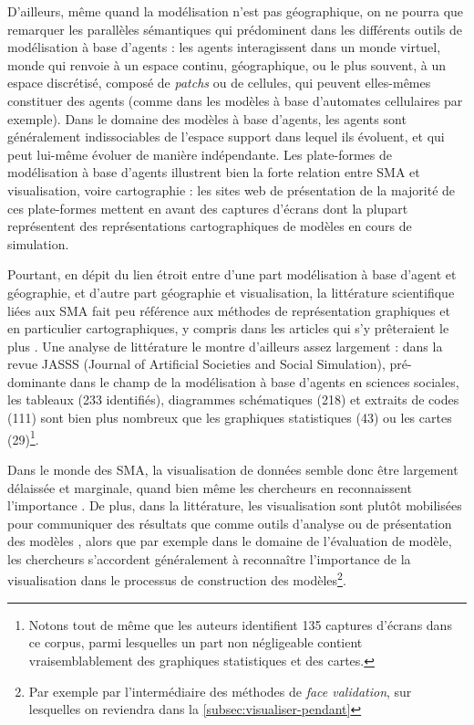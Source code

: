 \documentclass[a4paper, 12pt]{article}
\begin{document}
D'ailleurs, même quand la modélisation n'est pas géographique, on ne pourra que remarquer les parallèles sémantiques qui prédominent dans les différents outils de modélisation à base d'agents : les agents interagissent dans un \og monde virtuel\fg{}, monde qui renvoie à un espace continu, géographique, ou le plus souvent, à un espace discrétisé, composé de \og \textit{patchs} \fg{} ou de cellules, qui peuvent elles-mêmes constituer des agents (comme dans les modèles à base d'automates cellulaires par exemple). Dans le domaine des modèles à base d'agents, les agents sont généralement indissociables de l'espace support dans lequel ils évoluent, et qui peut lui-même évoluer de manière indépendante.
Les plate-formes de modélisation à base d'agents illustrent bien la forte relation entre SMA et visualisation, voire cartographie : les sites web de présentation de la majorité de ces plate-formes mettent en avant des captures d'écrans dont la plupart représentent des représentations cartographiques de modèles en cours de simulation.

Pourtant, en dépit du lien étroit entre d'une part modélisation à base d'agent et géographie, et d'autre part géographie et visualisation, la littérature scientifique liées aux SMA fait peu référence aux méthodes de représentation graphiques et en particulier cartographiques, y compris dans les articles qui s'y prêteraient le plus \autocite{lee_complexities_2015,kornhauser}.
Une analyse de littérature le montre d'ailleurs assez largement \autocite[Table 4]{angus_anarchy_2015} : dans la revue JASSS (Journal of Artificial Societies and Social Simulation), pré-dominante dans le champ de la modélisation à base d'agents en sciences sociales, les tableaux (233 identifiés), diagrammes schématiques (218) et extraits de codes (111) sont bien plus nombreux que les graphiques statistiques (43) ou les cartes (29)\footnote{Notons tout de même que les auteurs identifient 135 captures d'écrans dans ce corpus, parmi lesquelles un part non négligeable contient vraisemblablement des graphiques statistiques et des cartes.}.

Dans le monde des SMA, la visualisation de données semble donc être largement délaissée et marginale, quand bien même les chercheurs en reconnaissent l'importance \autocite{kornhauser}. De plus, dans la littérature, les visualisation sont plutôt mobilisées pour communiquer des résultats que comme outils d'analyse ou de présentation des modèles \autocite{angus_anarchy_2015}, alors que par exemple dans le domaine de l'évaluation de modèle, les chercheurs s'accordent généralement à reconnaître l'importance de la visualisation dans le processus de construction des modèles\footnote{Par exemple par l'intermédiaire des méthodes de \og \textit{face validation}\fg{}, sur lesquelles on reviendra dans la \cref{subsec:visualiser-pendant}}.
\end{document}
